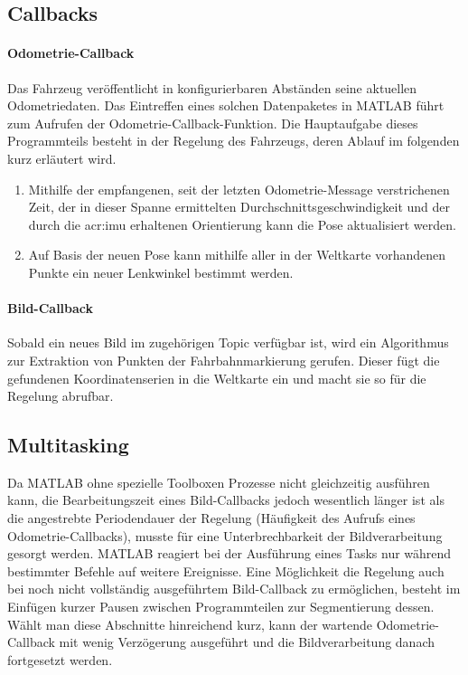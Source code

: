 \subsection{Callbacks}
\paragraph{Odometrie-Callback}
Das Fahrzeug veröffentlicht in konfigurierbaren Abständen seine aktuellen Odometriedaten.
Das Eintreffen eines solchen Datenpaketes in MATLAB führt zum Aufrufen der Odometrie-Callback-Funktion. Die Hauptaufgabe dieses Programmteils besteht in der Regelung des Fahrzeugs, deren Ablauf im folgenden kurz erläutert wird.
\begin{enumerate}
\item Mithilfe der empfangenen, seit der letzten Odometrie-Message verstrichenen Zeit, der in dieser Spanne ermittelten Durchschnittsgeschwindigkeit und der durch die \gls{acr:imu} erhaltenen Orientierung kann die Pose aktualisiert werden.
\item Auf Basis der neuen Pose kann mithilfe aller in der Weltkarte vorhandenen Punkte ein neuer Lenkwinkel bestimmt werden.
\end{enumerate}
\paragraph{Bild-Callback}
Sobald ein neues Bild im zugehörigen Topic verfügbar ist, wird ein Algorithmus zur Extraktion von Punkten der Fahrbahnmarkierung gerufen. Dieser fügt die gefundenen Koordinatenserien in die Weltkarte ein und macht sie so für die Regelung abrufbar.

\subsection{Multitasking}
Da MATLAB ohne spezielle Toolboxen Prozesse nicht gleichzeitig ausführen kann, die Bearbeitungszeit eines Bild-Callbacks jedoch wesentlich länger ist als die angestrebte Periodendauer der Regelung (Häufigkeit des Aufrufs eines Odometrie-Callbacks), musste für eine Unterbrechbarkeit der Bildverarbeitung gesorgt werden. MATLAB reagiert bei der Ausführung eines Tasks nur während bestimmter Befehle auf weitere Ereignisse. Eine Möglichkeit die Regelung auch bei noch nicht vollständig ausgeführtem Bild-Callback zu ermöglichen, besteht im Einfügen kurzer Pausen zwischen Programmteilen zur Segmentierung dessen. Wählt man diese Abschnitte hinreichend kurz, kann der wartende Odometrie-Callback mit wenig Verzögerung ausgeführt und die Bildverarbeitung danach fortgesetzt werden.


